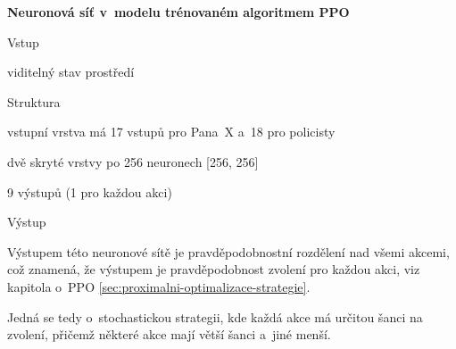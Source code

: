   \textbf{Neuronová síť v~modelu trénovaném algoritmem PPO}
    \begin{myitemize}
      \item Vstup
        \begin{myitemize}
          \item viditelný stav prostředí
        \end{myitemize}
      \item Struktura
        \begin{myitemize}
          \item vstupní vrstva má 17 vstupů pro Pana~X a~18 pro policisty
          \item dvě skryté vrstvy po 256 neuronech [256, 256]
          \item 9 výstupů (1 pro každou akci)
        \end{myitemize}
      \item Výstup
        \begin{myitemize}
          \item Výstupem této neuronové sítě je pravděpodobnostní rozdělení nad všemi akcemi, což znamená, že výstupem je pravděpodobnost zvolení pro každou akci, viz kapitola o~PPO \ref{sec:proximalni-optimalizace-strategie}.
          \item Jedná se tedy o~stochastickou strategii, kde každá akce má určitou šanci na zvolení, přičemž některé akce mají větší šanci a~jiné menší.
        \end{myitemize}
    \end{myitemize}

